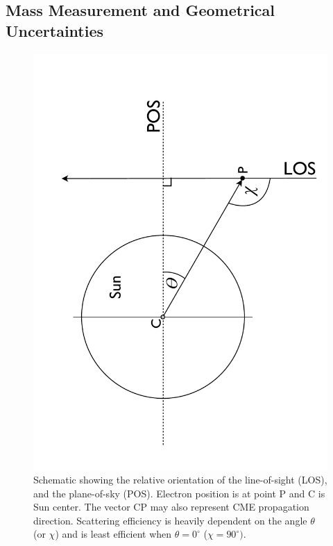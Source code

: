 \subsection{Mass Measurement and Geometrical Uncertainties}
\begin{figure}[t!]
\begin{center}
\includegraphics[trim = 0cm 0cm 0cm 0cm, scale=0.4, angle=270]{images/LOS_POS_2.pdf}
\caption[Line-of-sight and plane-of-sky orientations]{Schematic showing the relative orientation of the line-of-sight (LOS), and the plane-of-sky (POS). Electron position is at point P and C is 
Sun center. The vector CP may also represent CME propagation direction. Scattering efficiency is heavily dependent on the angle $\theta$ 
(or $\chi$) and is least efficient 
when $\theta = 0^{\circ}$ ($\chi=90^{\circ})$.}
\label{fig:LOS_POS_2}
\end{center}
\end{figure}

